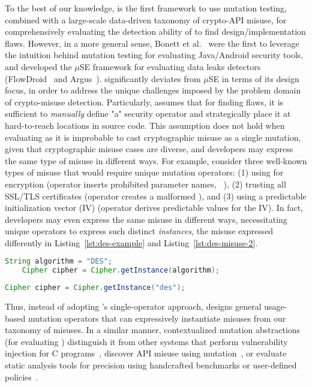 To the best of our knowledge, \tool is the first framework to use mutation testing, combined with a large-scale data-driven taxonomy of crypto-API misuse, for comprehensively evaluating the detection ability of \detectors to find design/implementation flaws.
However, in a more general sense, Bonett et al.~\cite{bkm+18} were the first to leverage the intuition behind mutation testing for evaluating Java/Android security tools, and developed the $\mu$SE framework for evaluating data leaks detectors (\eg FlowDroid~\cite{arf+14} and Argus~\cite{wror14}).
\tool significantly deviates from $\mu$SE in terms of its design focus, in order to address the unique challenges imposed by the problem domain of crypto-misuse detection. Particularly, \muse assumes that for finding flaws, it is sufficient to {\em manually} define "a" security operator and strategically place it at hard-to-reach locations in source code.
This assumption does not hold when evaluating \detectors as it is improbable to cast cryptographic misuse as a single mutation, given that cryptographic misuse cases are diverse, and developers may express the same type of misuse in different ways.
For example, consider three well-known types of misuse that would require unique mutation operators: {\sf (1)} using \DES for encryption (operator inserts prohibited parameter names, \eg\ \DES), {\sf (2)} trusting all SSL/TLS certificates (operator creates a malformed \trustManager), and {\sf (3)} using a predictable initialization vector (IV) (operator derives predictable values for the IV).
In fact, developers may even express the same misuse in different ways, necessitating unique operators to express such distinct {\em instances}, \eg the \DES misuse expressed differently in Listing~\ref{lst:des-example} and Listing~\ref{lst:des-misuse-2}.

\begin{lstlisting}[frame=tb,caption={\small Instantiating ``DES'' as a cipher instance.}, label={lst:des-example},language=java]
    String algorithm = "DES";
    Cipher cipher = Cipher.getInstance(algorithm);
\end{lstlisting}
\begin{lstlisting}[frame=tb,caption={\small Instantiating \texttt{DES} as a cipher instance in lower case.}, label={lst:des-misuse-2},language=java]
    Cipher cipher = Cipher.getInstance("des");
\end{lstlisting}

Thus, instead of adopting \muse's single-operator approach, \tool designs general usage-based mutation operators that can expressively instantiate misuses from our taxonomy of misuses.
In a similar manner, \tools contextualized mutation abstractions (\ie for evaluating \detectors) distinguish it from other systems that perform vulnerability injection for C programs~\cite{dhk+16}, discover API misuse using mutation~\cite{WLW+19,GKL+19}, or evaluate static analysis tools for precision using handcrafted benchmarks or user-defined policies~\cite{QWR18,PBW18}.


